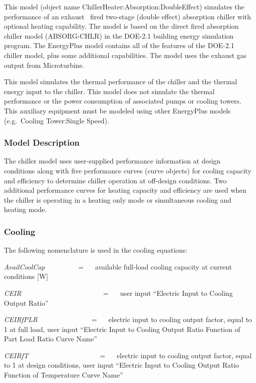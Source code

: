 This model (object name ChillerHeater:Absorption:DoubleEffect) simulates the performance of an exhaust~ fired two-stage (double effect) absorption chiller with optional heating capability. The model is based on the direct fired absorption chiller model (ABSORG-CHLR) in the DOE-2.1 building energy simulation program. The EnergyPlus model contains all of the features of the DOE-2.1 chiller model, plus some additional capabilities. The model uses the exhaust gas output from Microturbine.

This model simulates the thermal performance of the chiller and the thermal energy input to the chiller. This model does not simulate the thermal performance or the power consumption of associated pumps or cooling towers. This auxiliary equipment must be modeled using other EnergyPlus models (e.g.~Cooling Tower:Single Speed).

\subsubsection{Model Description}\label{model-description-1-003}

The chiller model uses user-supplied performance information at design conditions along with five performance curves (curve objects) for cooling capacity and efficiency to determine chiller operation at off-design conditions. Two additional performance curves for heating capacity and efficiency are used when the chiller is operating in a heating only mode or simultaneous cooling and heating mode.

\subsubsection{Cooling}\label{cooling-1}

The following nomenclature is used in the cooling equations:

\emph{AvailCoolCap}~~~~~~~~~ = ~~ available full-load cooling capacity at current conditions {[}W{]}

\emph{CEIR}~~~~~~~~~~~~~~~~~~~~~~~ = ~~ user input ``Electric Input to Cooling Output Ratio''

\emph{CEIRfPLR}~~~~~~~~~~~~~~~ = ~~ electric input to cooling output factor, equal to 1 at full load, user input ``Electric Input to Cooling Output Ratio Function of Part Load Ratio Curve Name''

\emph{CEIRfT}~~~~~~~~~~~~~~~~~~~~ = ~~ electric input to cooling output factor, equal to 1 at design conditions, user input ``Electric Input to Cooling Output Ratio Function of Temperature Curve Name''

